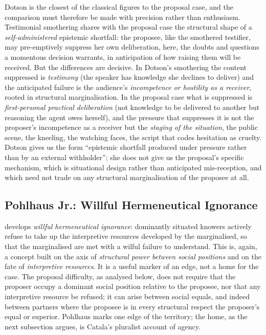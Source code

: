 Dotson is the closest of the classical figures to the proposal case, and the comparison must therefore be made with precision rather than enthusiasm. Testimonial smothering shares with the proposal case the structural shape of a \emph{self-administered} epistemic shortfall: the proposee, like the smothered testifier, may pre-emptively suppress her own deliberation, here, the doubts and questions a momentous decision warrants, in anticipation of how raising them will be received. But the differences are decisive. In Dotson's smothering the content suppressed is \emph{testimony} (the speaker has knowledge she declines to deliver) and the anticipated failure is the audience's \emph{incompetence or hostility as a receiver}, rooted in structural marginalisation. In the proposal case what is suppressed is \emph{first-personal practical deliberation} (not knowledge to be delivered to another but reasoning the agent owes herself), and the pressure that suppresses it is not the proposer's incompetence as a receiver but the \emph{staging of the situation}, the public scene, the kneeling, the watching faces, the script that codes hesitation as cruelty. Dotson gives us the form ``epistemic shortfall produced under pressure rather than by an external withholder''; she does not give us the proposal's specific mechanism, which is situational design rather than anticipated mis-reception, and which need not trade on any structural marginalisation of the proposee at all.

\subsection{Pohlhaus Jr.: Willful Hermeneutical Ignorance}

\textcite{pohlhaus2012relational} develops \emph{willful hermeneutical ignorance}: dominantly situated knowers actively refuse to take up the interpretive resources developed by the marginalised, so that the marginalised are met with a wilful failure to understand. This is, again, a concept built on the axis of \emph{structural power between social positions} and on the fate of \emph{interpretive resources}. It is a useful marker of an edge, not a home for the case. The proposal difficulty, as analysed below, does not require that the proposer occupy a dominant social position relative to the proposee, nor that any interpretive resource be refused; it can arise between social equals, and indeed between partners where the proposee is in every structural respect the proposer's equal or superior. Pohlhaus marks one edge of the territory; the home, as the next subsection argues, is Catala's pluralist account of agency.

